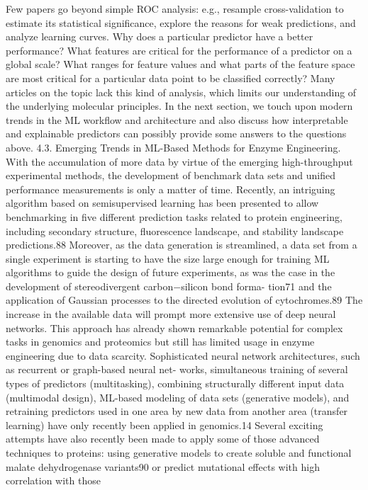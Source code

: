 \documentclass[12pt]{article}
\begin{document}
Few papers go beyond simple
ROC analysis: e.g., resample cross-validation to estimate its
statistical signiﬁcance, explore the reasons for weak predictions,
and analyze learning curves. Why does a particular predictor
have a better performance? What features are critical for the
performance of a predictor on a global scale? What ranges for
feature values and what parts of the feature space are most
critical for a particular data point to be classiﬁed correctly?
Many articles on the topic lack this kind of analysis, which
limits our understanding of the underlying molecular
principles. In the next section, we touch upon modern trends
in the ML workﬂow and architecture and also discuss how
interpretable and explainable predictors can possibly provide
some answers to the questions above.
4.3. Emerging Trends in ML-Based Methods for
Enzyme Engineering. With the accumulation of more data
by virtue of the emerging high-throughput experimental
methods, the development of benchmark data sets and uniﬁed
performance measurements is only a matter of time. Recently,
an intriguing algorithm based on semisupervised learning has
been presented to allow benchmarking in ﬁve diﬀerent
prediction tasks related to protein engineering, including
secondary structure, ﬂuorescence landscape, and stability
landscape predictions.88 Moreover, as the data generation is
streamlined, a data set from a single experiment is starting to
have the size large enough for training ML algorithms to guide
the design of future experiments, as was the case in the
development of stereodivergent carbon−silicon bond forma-
tion71 and the application of Gaussian processes to the
directed evolution of cytochromes.89
The increase in the available data will prompt more
extensive use of deep neural networks. This approach has
already shown remarkable potential for complex tasks in
genomics and proteomics but still has limited usage in enzyme
engineering due to data scarcity. Sophisticated neural network
architectures, such as recurrent or graph-based neural net-
works, simultaneous training of several types of predictors
(multitasking), combining structurally diﬀerent input data
(multimodal design), ML-based modeling of data sets
(generative models), and retraining predictors used in one
area by new data from another area (transfer learning) have
only recently been applied in genomics.14 Several exciting
attempts have also recently been made to apply some of those
advanced techniques to proteins: using generative models to
create soluble and functional malate dehydrogenase variants90
or predict mutational eﬀects with high correlation with those
\end{document}
